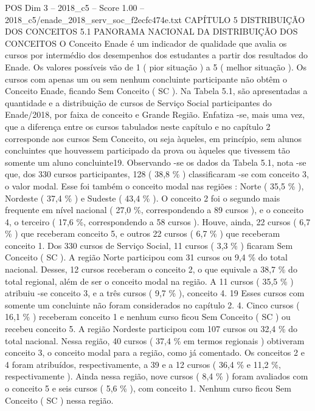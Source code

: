 \begin{textsample}{POS Dim 3 – 2018\_c5 – Score 1.00 – 2018\_c5/enade\_2018\_serv\_soc\_f2ecfc474e.txt}  \label{ex:f3_pos_183}
CAPÍTULO 5 DISTRIBUIÇÃO DOS CONCEITOS 5.1 PANORAMA NACIONAL DA DISTRIBUIÇÃO DOS CONCEITOS O Conceito Enade é um indicador de qualidade que avalia os cursos por intermédio dos desempenhos dos estudantes a partir dos resultados do Enade.
Os valores possíveis vão de 1 ( pior situação ) a 5 ( melhor situação ).
Os cursos com apenas um ou sem nenhum concluinte participante não obtêm o Conceito Enade, ficando Sem Conceito ( SC ).
Na Tabela 5.1, são apresentadas a quantidade e a distribuição de cursos de Serviço Social participantes do Enade/2018, por faixa de conceito e Grande Região.
Enfatiza -se, mais uma vez, que a diferença entre os cursos tabulados neste capítulo e no capítulo 2 corresponde aos cursos Sem Conceito, ou seja àqueles, em princípio, sem alunos concluintes que houvessem participado da prova ou àqueles que tivessem tão somente um aluno concluinte19.
Observando -se os dados da Tabela 5.1, nota -se que, dos 330 cursos participantes, 128 ( 38,8 \% ) classificaram -se com conceito 3, o valor modal.
Esse foi também o conceito modal nas regiões : Norte ( 35,5 \% ), Nordeste ( 37,4 \% ) e Sudeste ( 43,4 \% ).
O conceito 2 foi o segundo mais frequente em nível nacional ( 27,0 \%, correspondendo a 89 cursos ), e o conceito 4, o terceiro ( 17,6 \%, correspondendo a 58 cursos ).
Houve, ainda, 22 cursos ( 6,7 \% ) que receberam conceito 5, e outros 22 cursos ( 6,7 \% ) que receberam conceito 1.
Dos 330 cursos de Serviço Social, 11 cursos ( 3,3 \% ) ficaram Sem Conceito ( SC ).
A região Norte participou com 31 cursos ou 9,4 \% do total nacional.
Desses, 12 cursos receberam o conceito 2, o que equivale a 38,7 \% do total regional, além de ser o conceito modal na região.
A 11 cursos ( 35,5 \% ) atribuiu -se conceito 3, e a três cursos ( 9,7 \% ), conceito 4. 19 Esses cursos com somente um concluinte não foram considerados no capítulo 2. 4.
Cinco cursos ( 16,1 \% ) receberam conceito 1 e nenhum curso ficou Sem Conceito ( SC ) ou recebeu conceito 5.
A região Nordeste participou com 107 cursos ou 32,4 \% do total nacional.
Nessa região, 40 cursos ( 37,4 \% em termos regionais ) obtiveram conceito 3, o conceito modal para a região, como já comentado.
Os conceitos 2 e 4 foram atribuídos, respectivamente, a 39 e a 12 cursos ( 36,4 \% e 11,2 \%, respectivamente ).
Ainda nessa região, nove cursos ( 8,4 \% ) foram avaliados com o conceito 5 e seis cursos ( 5,6 \% ), com conceito 1.
Nenhum curso ficou Sem Conceito ( SC ) nessa região.

\end{textsample}

